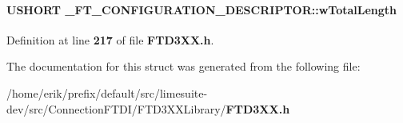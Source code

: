 \paragraph[{w\+Total\+Length}]{\setlength{\rightskip}{0pt plus 5cm}U\+S\+H\+O\+RT \+\_\+\+F\+T\+\_\+\+C\+O\+N\+F\+I\+G\+U\+R\+A\+T\+I\+O\+N\+\_\+\+D\+E\+S\+C\+R\+I\+P\+T\+O\+R\+::w\+Total\+Length}\label{struct__FT__CONFIGURATION__DESCRIPTOR_a28454e40c1d2be7119f0fe34ec51b065}


Definition at line {\bf 217} of file {\bf F\+T\+D3\+X\+X.\+h}.



The documentation for this struct was generated from the following file\+:\begin{DoxyCompactItemize}
\item 
/home/erik/prefix/default/src/limesuite-\/dev/src/\+Connection\+F\+T\+D\+I/\+F\+T\+D3\+X\+X\+Library/{\bf F\+T\+D3\+X\+X.\+h}\end{DoxyCompactItemize}
